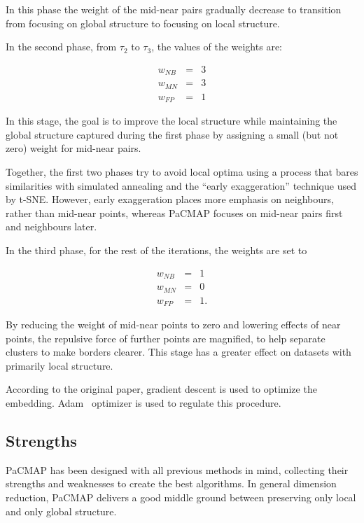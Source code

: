 In this phase the weight of the mid-near pairs gradually decrease to transition from focusing on global structure to focusing on local structure.

In the second phase, from $\tau_2$ to $\tau_3$, the values of the weights are:

\begin{equation}
	\begin{aligned}
		w_{NB} & = & 3 \\
		w_{MN} & = & 3 \\
		w_{FP} & = & 1
	\end{aligned}
\end{equation}

In this stage, the goal is to improve the local structure while maintaining the global structure captured during the first phase by assigning a small (but not zero) weight for mid-near pairs.

Together, the first two phases try to avoid local optima using a process that bares similarities with simulated annealing and the ``early exaggeration'' technique used by t-SNE. However, early exaggeration places more emphasis on neighbours, rather than mid-near points, whereas PaCMAP focuses on mid-near pairs first and neighbours later.

In the third phase, for the rest of the iterations, the weights are set to

\begin{equation}
	\begin{aligned}
		w_{NB} & = & 1 \\
		w_{MN} & = & 0 \\
		w_{FP} & = & 1.
	\end{aligned}
\end{equation}

By reducing the weight of mid-near points to zero and lowering effects of near points, the repulsive force of further points are magnified, to help separate clusters to make borders clearer. This stage has a greater effect on datasets with primarily local structure.

According to the original paper, gradient descent is used to optimize the embedding. Adam~\cite{bib:adam} optimizer is used to regulate this procedure.

\subsection{Strengths}

PaCMAP has been designed with all previous methods in mind, collecting their strengths and weaknesses to create the best algorithms. In general dimension reduction, PaCMAP delivers a good middle ground between preserving only local and only global structure.

